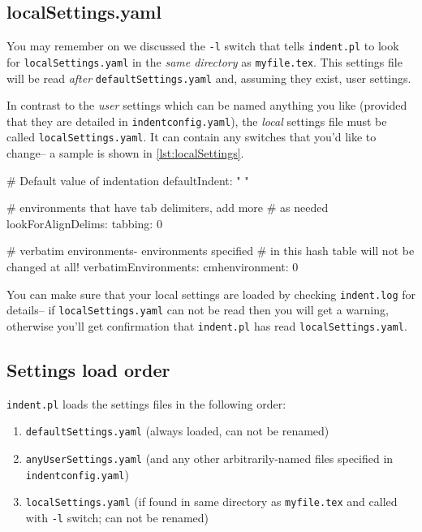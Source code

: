 \subsection{localSettings.yaml}
You may remember on  we discussed the \lstinline!-l! switch
that tells \lstinline!indent.pl! to look for \lstinline!localSettings.yaml! in the 
\emph{same directory} as \lstinline!myfile.tex!. This settings file will 
be read \emph{after} \lstinline!defaultSettings.yaml! and, assuming they exist, 
user settings. 
 	 	 	 	 	
In contrast to the \emph{user} settings which can be named anything you like (provided that
they are detailed in \lstinline!indentconfig.yaml!), the \emph{local} settings file
must be called \lstinline!localSettings.yaml!. It can contain any switches that you'd
like to change-- a sample is shown in \cref{lst:localSettings}.
 	 	 	 	 	
\begin{yaml}[caption={\lstinline!localSettings.yaml! (example)},label={lst:localSettings}]
# Default value of indentation
defaultIndent: " "

# environments that have tab delimiters, add more 
# as needed
lookForAlignDelims:
   tabbing: 0

#  verbatim environments- environments specified 
#  in this hash table will not be changed at all!
verbatimEnvironments:
    cmhenvironment: 0
\end{yaml}
 	 	 	 	 	
You can make sure that your local settings are loaded by checking \lstinline!indent.log!
for details-- if \lstinline!localSettings.yaml! can not be read then you will
get a warning, otherwise you'll get confirmation that 
\lstinline!indent.pl! has read \lstinline!localSettings.yaml!.
 	 	 	 	 	
\subsection{Settings load order}
\lstinline!indent.pl! loads the settings files in the following order:
\begin{enumerate}
	\item \lstinline!defaultSettings.yaml! (always loaded, can not be renamed)
	\item \lstinline!anyUserSettings.yaml! (and any other arbitrarily-named files specified in \lstinline!indentconfig.yaml!)
	\item \lstinline!localSettings.yaml! (if found in same directory as \lstinline!myfile.tex! and called
	with \lstinline!-l! switch; can not be renamed)
\end{enumerate}
 	 	 	 	 	
